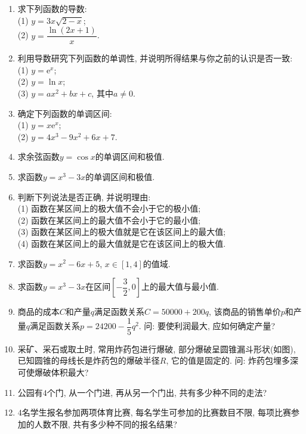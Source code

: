 \documentclass[10pt,a4paper]{article}
\begin{document}
\begin{enumerate}[1.]
\item 求下列函数的导数:\\
(1) $y=3x \sqrt{2-x}$;\\
(2) $y=\dfrac{\ln(2x+1)}x$. 
\item 利用导数研究下列函数的单调性, 并说明所得结果与你之前的认识是否一致:\\
(1) $y=\mathrm{e}^x$;\\
(2) $y=\ln x$;\\
(3) $y=ax^2+bx+c$, 其中$a\ne 0$.
\item 确定下列函数的单调区间:\\
(1) $y=x\mathrm{e}^x$;\\
(2) $y=4x^3-9x^2+6x+7$.
\item 求余弦函数$y=\cos x$的单调区间和极值.
\item 求函数$y=x^3-3x$的单调区间和极值.
\item 判断下列说法是否正确, 并说明理由:\\
(1) 函数在某区间上的极大值不会小于它的极小值;\\
(2) 函数在某区间上的最大值不会小于它的最小值;\\
(3) 函数在某区间上的极大值就是它在该区间上的最大值;\\
(4) 函数在某区间上的最大值就是它在该区间上的极大值.
\item 求函数$y=x^2-6x+5$, $x\in [1, 4]$的值域.
\item 求函数$y=x^3-3x$在区间$[-\dfrac 32,0]$上的最大值与最小值. 
\item 商品的成本$C$和产量$q$满足函数关系$C=50000+200q$, 该商品的销售单价$p$和产量$q$满足函数关系$p=24200-\dfrac 15q^2$. 问: 要使利润最大, 应如何确定产量?
\item 采矿、采石或取土时, 常用炸药包进行爆破, 部分爆破呈圆锥漏斗形状(如图), 已知圆锥的母线长是炸药包的爆破半径$R$, 它的值是固定的. 问: 炸药包埋多深可使爆破体积最大? 
\begin{center}
\end{center}
\item 公园有$4$个门, 从一个门进, 再从另一个门出, 共有多少种不同的走法?
\item $4$名学生报名参加两项体育比赛, 每名学生可参加的比赛数目不限, 每项比赛参加的人数不限, 共有多少种不同的报名结果? 

\end{enumerate}
\end{document}
